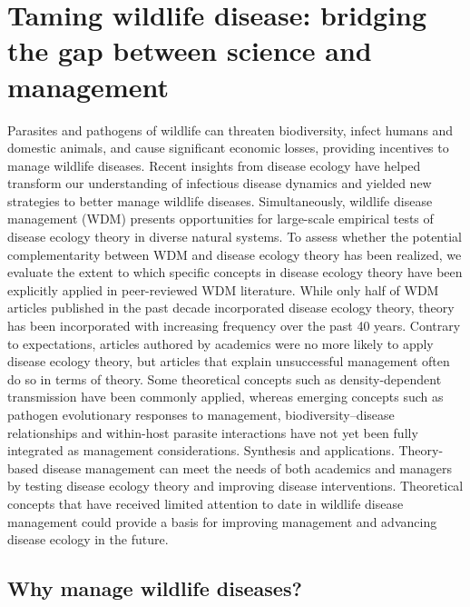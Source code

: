 \chapter{Taming wildlife disease: bridging the gap between science and management}
\label{ch1}


Parasites and pathogens of wildlife can threaten biodiversity, infect humans and domestic animals, and cause significant economic losses, providing incentives to manage wildlife diseases. Recent insights from disease ecology have helped transform our understanding of infectious disease dynamics and yielded new strategies to better manage wildlife diseases. Simultaneously, wildlife disease management (WDM) presents opportunities for large-scale empirical tests of disease ecology theory in diverse natural systems.
To assess whether the potential complementarity between WDM and disease ecology theory has been realized, we evaluate the extent to which specific concepts in disease ecology theory have been explicitly applied in peer-reviewed WDM literature.
While only half of WDM articles published in the past decade incorporated disease ecology theory, theory has been incorporated with increasing frequency over the past 40 years. Contrary to expectations, articles authored by academics were no more likely to apply disease ecology theory, but articles that explain unsuccessful management often do so in terms of theory.
Some theoretical concepts such as density-dependent transmission have been commonly applied, whereas emerging concepts such as pathogen evolutionary responses to management, biodiversity–disease relationships and within-host parasite interactions have not yet been fully integrated as management considerations.
Synthesis and applications. Theory-based disease management can meet the needs of both academics and managers by testing disease ecology theory and improving disease interventions. Theoretical concepts that have received limited attention to date in wildlife disease management could provide a basis for improving management and advancing disease ecology in the future.

\section{Why manage wildlife diseases?}

